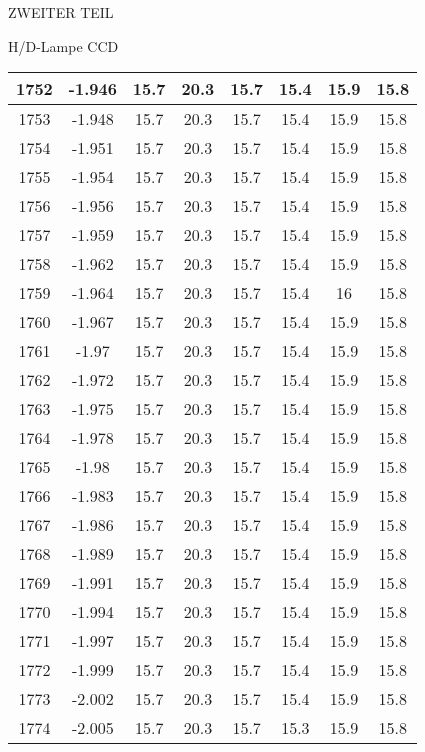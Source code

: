 \begin{appendix}
\begin{chapter}{ZWEITER TEIL}
\begin{section}{H/D-Lampe CCD}
\begin{scriptsize}
\begin{longtable}[htbp]{|c|c|c|c|c|c|c|c|}
            1752 & -1.946 & 15.7 & 20.3 & 15.7 & 15.4 & 15.9 & 15.8 \\ \hline
            1753 & -1.948 & 15.7 & 20.3 & 15.7 & 15.4 & 15.9 & 15.8 \\ \hline
            1754 & -1.951 & 15.7 & 20.3 & 15.7 & 15.4 & 15.9 & 15.8 \\ \hline
            1755 & -1.954 & 15.7 & 20.3 & 15.7 & 15.4 & 15.9 & 15.8 \\ \hline
            1756 & -1.956 & 15.7 & 20.3 & 15.7 & 15.4 & 15.9 & 15.8 \\ \hline
            1757 & -1.959 & 15.7 & 20.3 & 15.7 & 15.4 & 15.9 & 15.8 \\ \hline
            1758 & -1.962 & 15.7 & 20.3 & 15.7 & 15.4 & 15.9 & 15.8 \\ \hline
            1759 & -1.964 & 15.7 & 20.3 & 15.7 & 15.4 & 16 & 15.8 \\ \hline
            1760 & -1.967 & 15.7 & 20.3 & 15.7 & 15.4 & 15.9 & 15.8 \\ \hline
            1761 & -1.97 & 15.7 & 20.3 & 15.7 & 15.4 & 15.9 & 15.8 \\ \hline
            1762 & -1.972 & 15.7 & 20.3 & 15.7 & 15.4 & 15.9 & 15.8 \\ \hline
            1763 & -1.975 & 15.7 & 20.3 & 15.7 & 15.4 & 15.9 & 15.8 \\ \hline
            1764 & -1.978 & 15.7 & 20.3 & 15.7 & 15.4 & 15.9 & 15.8 \\ \hline
            1765 & -1.98 & 15.7 & 20.3 & 15.7 & 15.4 & 15.9 & 15.8 \\ \hline
            1766 & -1.983 & 15.7 & 20.3 & 15.7 & 15.4 & 15.9 & 15.8 \\ \hline
            1767 & -1.986 & 15.7 & 20.3 & 15.7 & 15.4 & 15.9 & 15.8 \\ \hline
            1768 & -1.989 & 15.7 & 20.3 & 15.7 & 15.4 & 15.9 & 15.8 \\ \hline
            1769 & -1.991 & 15.7 & 20.3 & 15.7 & 15.4 & 15.9 & 15.8 \\ \hline
            1770 & -1.994 & 15.7 & 20.3 & 15.7 & 15.4 & 15.9 & 15.8 \\ \hline
            1771 & -1.997 & 15.7 & 20.3 & 15.7 & 15.4 & 15.9 & 15.8 \\ \hline
            1772 & -1.999 & 15.7 & 20.3 & 15.7 & 15.4 & 15.9 & 15.8 \\ \hline
            1773 & -2.002 & 15.7 & 20.3 & 15.7 & 15.4 & 15.9 & 15.8 \\ \hline
            1774 & -2.005 & 15.7 & 20.3 & 15.7 & 15.3 & 15.9 & 15.8 \\ \hline

\end{longtable}
\end{scriptsize}
\end{section}
\end{chapter}
\end{appendix}
